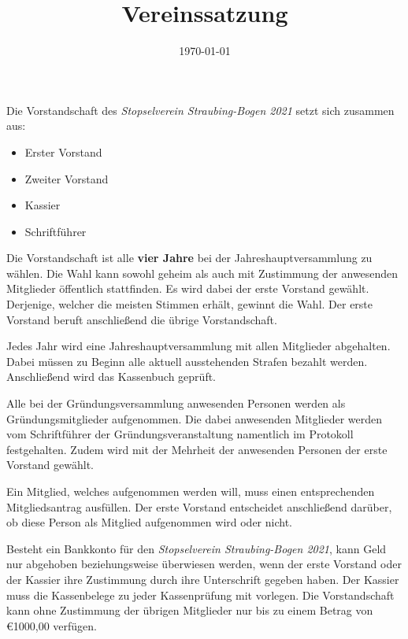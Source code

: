 \documentclass[a4paper,12pt]{scrartcl}
\title{Vereinssatzung}
\author{\vereinsName}
\date{\today}
\newcommand{\vereinsName}{Stopselverein Straubing-Bogen 2021}
\begin{document}
    \maketitle

    Die Vorstandschaft des \emph{\vereinsName} setzt sich zusammen aus:
    \begin{itemize}
        \item Erster Vorstand
        \item Zweiter Vorstand
        \item Kassier
        \item Schriftführer
    \end{itemize}

    Die Vorstandschaft ist alle \textbf{vier Jahre}
    bei der Jahreshauptversammlung zu wählen.
    Die Wahl kann sowohl geheim als auch mit Zustimmung der anwesenden Mitglieder
    öffentlich stattfinden.
    Es wird dabei der erste Vorstand gewählt.
    Derjenige, welcher die meisten Stimmen erhält, gewinnt die Wahl.
    Der erste Vorstand beruft anschließend die übrige Vorstandschaft.

    Jedes Jahr wird eine Jahreshauptversammlung mit allen Mitglieder abgehalten.
    Dabei müssen zu Beginn alle aktuell ausstehenden Strafen bezahlt werden.
    Anschließend wird das Kassenbuch geprüft.

    Alle bei der Gründungsversammlung anwesenden Personen werden als Gründungsmitglieder aufgenommen.
    Die dabei anwesenden Mitglieder werden vom Schriftführer der Gründungsveranstaltung namentlich im Protokoll festgehalten.
    Zudem wird mit der Mehrheit der anwesenden Personen der erste Vorstand gewählt.

    Ein Mitglied, welches aufgenommen werden will, muss einen entsprechenden Mitgliedsantrag ausfüllen.
    Der erste Vorstand entscheidet anschließend darüber,
    ob diese Person als Mitglied aufgenommen wird oder nicht.

    Besteht ein Bankkonto für den \emph{\vereinsName}, kann Geld nur abgehoben beziehungsweise überwiesen werden,
    wenn der erste Vorstand oder der Kassier ihre Zustimmung durch ihre Unterschrift gegeben haben.
    Der Kassier muss die Kassenbelege zu jeder Kassenprüfung mit vorlegen.
    Die Vorstandschaft kann ohne Zustimmung der übrigen Mitglieder nur bis zu einem Betrag von \euro{1000,00} verfügen.
\end{document}

